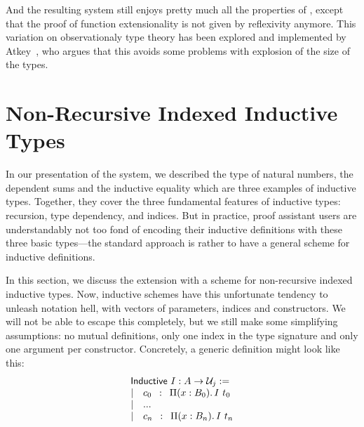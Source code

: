 And the resulting system still enjoys pretty much all the properties of 
\SetoidCC, except that the proof of function extensionality is not given by 
reflexivity anymore.
% 
This variation on observationaly type theory has been explored and implemented by 
Atkey~, who argues that this avoids some problems with 
explosion of the size of the types.

\section{Non-Recursive Indexed Inductive Types}
\label{sec:general-inductives}

In our presentation of the system, we described the type of natural numbers, 
% 
% 
the dependent sums and the inductive equality which are three examples of
inductive types.
% 
Together, they cover the three fundamental features of inductive types: 
recursion, type dependency, and indices. 
% 
But in practice, proof assistant users are understandably not too fond
of encoding their inductive definitions with these three basic types---the 
standard approach is rather to have a general scheme for inductive 
definitions.

In this section, we discuss the extension \SetoidCC with a scheme for 
non-recursive indexed inductive types.
% 
Now, inductive schemes have this unfortunate tendency to unleash 
notation hell, with vectors of parameters, indices and constructors. 
% 
We will not be able to escape this completely, but we still make some 
simplifying assumptions:
% 
no mutual definitions, only one index in the type signature and only one 
argument per constructor. Concretely, a generic definition might look like this:\\
\[
\begin{array}{l}
\mathsf{Inductive}\ I : A \to \mathcal{U}_j := \\
| \quad c_0 \enskip : \enskip \Pi (x : B_0).\, {I\ t_0}\\
| \quad ... \\
| \quad c_n \enskip : \enskip \Pi (x : B_n).\, {I\ t_n}
\end{array}
\]

